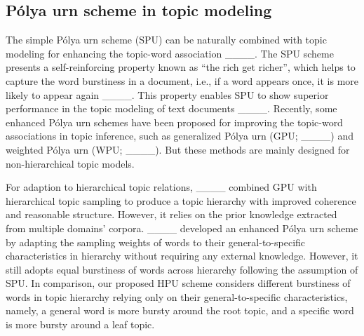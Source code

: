 \subsection{P\'olya urn scheme in topic modeling}
The simple P\'olya urn scheme (SPU) can be naturally combined with topic modeling for enhancing the topic-word association ____.
The SPU scheme presents a self-reinforcing property known as “the rich get richer”, which helps to capture the word burstiness in a document, i.e., if a word appears once, it is more likely to appear again ____.
This property enables SPU to show superior performance in the topic modeling of text documents ____.
Recently, some enhanced P\'olya urn schemes have been proposed for improving the topic-word associations in topic inference, such as generalized P\'olya urn (GPU; ____) and weighted P\'olya urn (WPU; ____). But these methods are mainly designed for non-hierarchical topic models. 

For adaption to hierarchical topic relations, ____ combined GPU with hierarchical topic sampling to produce a topic hierarchy with improved coherence and reasonable structure. 
However, it relies on the prior knowledge extracted from multiple domains' corpora.
____ developed an enhanced P\'olya urn scheme by adapting the sampling weights of words to their general-to-specific characteristics in hierarchy without requiring any external knowledge. However, it still adopts equal burstiness of words across hierarchy following the assumption of SPU.
In comparison, our proposed HPU scheme considers different burstiness of words in topic hierarchy relying only on their general-to-specific characteristics, namely, a general word is more bursty around the root topic, and a specific word is more bursty around a leaf topic.